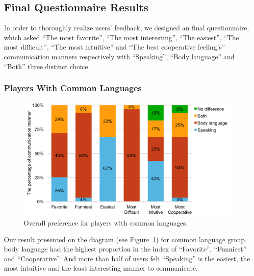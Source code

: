\subsection{Final Questionnaire Results}
In order to thoroughly realize users' feedback, we designed an final questionnaire, which asked ``The most favorite'', ``The most interesting'', ``The easiest'', ``The most difficult'', ``The most intuitive'' and ``The best cooperative feeling's'' communication manners respectively with ``Speaking'', ``Body language'' and ``Both'' three distinct choice.

\subsubsection{Players With Common Languages}

\begin{figure}[!h]
\centering
\includegraphics[width=0.9\columnwidth]{Figures/US_FQ_Com.pdf}
\caption{Overall preference for players with common languages.}
\label{fig:US_FQ_Com}
\end{figure}

Our result presented on the diagram (see Figure~\ref{fig:US_FQ_Com}) for common language group. 
body language had the highest proportion in the index of ``Favorite'', ``Funniest'' and ``Cooperative''.
And more than half of users felt ``Speaking'' is the easiest, the most intuitive and the least interesting manner to communicate.

